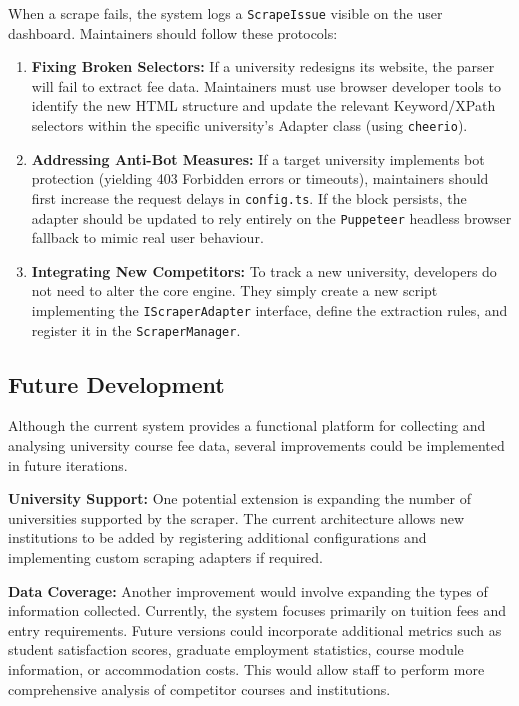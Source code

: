 When a scrape fails, the system logs a \texttt{ScrapeIssue} visible on the user dashboard. Maintainers should follow these protocols:
\begin{enumerate}
    \item \textbf{Fixing Broken Selectors:} If a university redesigns its website, the parser will fail to extract fee data. Maintainers must use browser developer tools to identify the new HTML structure and update the relevant Keyword/XPath selectors within the specific university's Adapter class (using \texttt{cheerio}).
    \item \textbf{Addressing Anti-Bot Measures:} If a target university implements bot protection (yielding 403 Forbidden errors or timeouts), maintainers should first increase the request delays in \texttt{config.ts}. If the block persists, the adapter should be updated to rely entirely on the \texttt{Puppeteer} headless browser fallback to mimic real user behaviour.
    \item \textbf{Integrating New Competitors:} To track a new university, developers do not need to alter the core engine. They simply create a new script implementing the \texttt{IScraperAdapter} interface, define the extraction rules, and register it in the \texttt{ScraperManager}.
\end{enumerate}


\subsection{Future Development}

Although the current system provides a functional platform for collecting and analysing university course fee data, several improvements could be implemented in future iterations.

\textbf{University Support:} One potential extension is expanding the number of universities supported by the scraper. The current architecture allows new institutions to be added by registering additional configurations and implementing custom scraping adapters if required.

\textbf{Data Coverage:} Another improvement would involve expanding the types of information collected. Currently, the system focuses primarily on tuition fees and entry requirements. Future versions could incorporate additional metrics such as student satisfaction scores, graduate employment statistics, course module information, or accommodation costs. This would allow staff to perform more comprehensive analysis of competitor courses and institutions.

